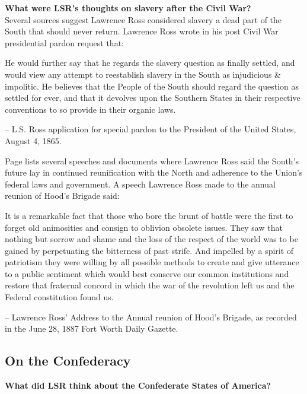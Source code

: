 \documentclass[12pt]{article}
\begin{document}
\textbf{What were LSR's thoughts on slavery after the Civil War? \\ }
Several sources suggest Lawrence Ross considered slavery a dead part of the South that should never return. Lawrence Ross wrote in his post Civil War presidential pardon request \cite{pardonrequest} that:

\begin{displayquote}
He would further say that he regards the slavery question as finally settled, and would view any attempt to reestablish slavery in the South as injudicious \& impolitic.  He believes that the People of the South should regard the question as settled for ever, and that it devolves upon the Southern States in their respective conventions to so provide in their organic laws.

-- L.S. Ross application for special pardon to the President of the United States, August 4, 1865.
\end{displayquote}

Page \cite[pg. 161--167]{page} lists several speeches and documents where Lawrence Ross said the South's future lay in continued reunification with the North and adherence to the Union's federal laws and government. A speech Lawrence Ross made to the annual reunion of Hood's Brigade \cite{ftworthgazette} said:

\begin{displayquote}
It is a remarkable fact that those who bore the brunt of battle were the first to forget old animosities and consign to oblivion obsolete issues.  They saw that nothing but sorrow and shame and the loss of the respect of the world was to be gained by perpetuating the bitterness of past strife.  And impelled by a spirit of patriotism they were willing by all possible methods to create and give utterance to a public sentiment which would best conserve our common institutions and restore that fraternal concord in which the war of the revolution left us and the Federal constitution found us.

-- Lawrence Ross' Address to the Annual reunion of Hood's Brigade, as recorded in the June 28, 1887 Fort Worth Daily Gazette.
\end{displayquote}

\subsection{On the Confederacy}
\textbf{What did LSR think about the Confederate States of America? \\}
\end{document}
